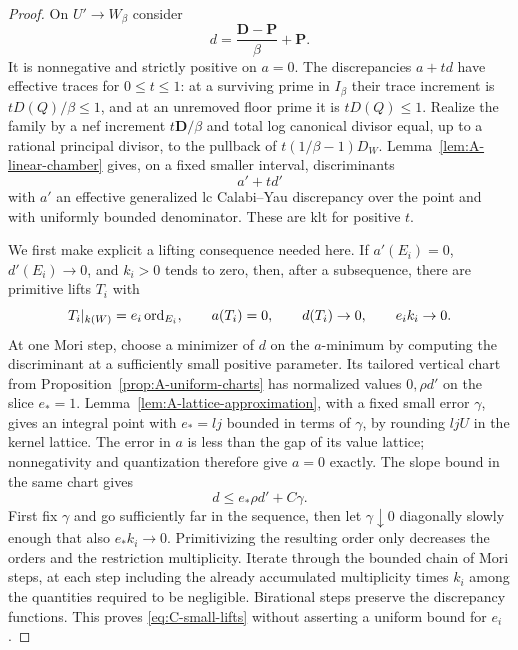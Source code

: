 \begin{proof}
On $U'\to W_\beta$ consider
\begin{equation}\label{eq:C-cutoff-direction}
 d=\frac{\mathbf D-\mathbf P}{\beta}+\mathbf P.
\end{equation}
It is nonnegative and strictly positive on $a=0$.  The discrepancies
$a+td$ have effective traces for $0\leq t\leq1$: at a surviving prime
in $I_\beta$ their trace increment is $tD(Q)/\beta\leq1$, and at an
unremoved floor prime it is $tD(Q)\leq1$.  Realize the family by a nef
increment $t\mathbf D/\beta$ and total log canonical divisor equal,
up to a rational principal divisor, to the pullback of
$t(1/\beta-1)D_W$.  Lemma~\ref{lem:A-linear-chamber} gives, on a fixed
smaller interval, discriminants
\[
                              a'+td'
\]
with $a'$ an effective generalized lc Calabi--Yau discrepancy over the
point and with uniformly bounded denominator.  These are klt for
positive $t$.

We first make explicit a lifting consequence needed here.  If
$a'(E_i)=0$, $d'(E_i)\to0$, and $k_i>0$ tends to zero, then, after a
subsequence, there are primitive lifts $T_i$ with
\begin{equation}\label{eq:C-small-lifts}
 T_i|_{k(W)}=e_i\operatorname{ord}_{E_i},\qquad
 a(T_i)=0,\qquad d(T_i)\to0,\qquad e_i k_i\to0.
\end{equation}
At one Mori step, choose a minimizer of $d$ on the $a$-minimum by
computing the discriminant at a sufficiently small positive parameter.
Its tailored vertical chart from Proposition~\ref{prop:A-uniform-charts}
has normalized values $0,\rho d'$ on the slice $e_*=1$.
Lemma~\ref{lem:A-lattice-approximation}, with a fixed small error
$\gamma$, gives an integral point with $e_*=lj$ bounded in terms of
$\gamma$, by rounding $ljU$ in the kernel lattice.  The error in $a$
is less than the gap of its value lattice; nonnegativity and quantization
therefore give $a=0$ exactly.  The slope bound in the same chart gives
\[
                   d\leq e_*\rho d'+C\gamma.
\]
First fix $\gamma$ and go sufficiently far in the sequence, then let
$\gamma\downarrow0$ diagonally slowly enough that also $e_*k_i\to0$.
Primitivizing the resulting order only decreases the orders and the
restriction multiplicity.  Iterate through the bounded chain of Mori
steps, at each step including the already accumulated multiplicity
times $k_i$ among the quantities required to be negligible.  Birational
steps preserve the discrepancy functions.  This proves
\eqref{eq:C-small-lifts} without asserting a uniform bound for $e_i$.


\end{proof}
